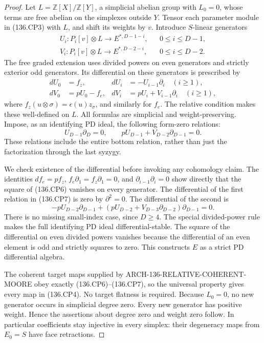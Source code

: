 \begin{proof}
Let \(L=\mathbb Z[X]/\mathbb Z[Y]\), a simplicial abelian
group with \(L_0=0\), whose terms are free abelian on the
simplexes outside \(Y\). Tensor each parameter module in
(136.CP3) with \(L\), and shift its weights by \(v\).
Introduce \(S\)-linear generators
\[
 \begin{array}{lll}
 U_i:P_i[v]\otimes L\longrightarrow E^{*,D-1-i},
       &&0\leq i\leq D-1,\\
 V_i:P_i[v]\otimes L\longrightarrow E^{*,D-2-i},
       &&0\leq i\leq D-2.
 \end{array}                                             \tag{136.CP5}
\]
The free graded extension uses divided powers on even generators
and strictly exterior odd generators. Its differential on these
generators is prescribed by
\[
 \begin{aligned}
 dU_0&=f_z,&
 dU_i&=-U_{i-1}\partial_i\quad(i\geq1),\\
 dV_0&=pU_0-f_e,&
 dV_i&=pU_i+V_{i-1}\partial_i\quad(i\geq1),
 \end{aligned}                                             \tag{136.CP6}
\]
where \(f_z(u\otimes\sigma)=\epsilon(u)z_\sigma\), and
similarly for \(f_e\). The relative condition makes these
well-defined on \(L\). All formulas are simplicial and
weight-preserving. Impose, as an identifying PD ideal, the
following form-zero relations:
\[
 U_{D-1}\partial_D=0,
 \qquad pU_{D-1}+V_{D-2}\partial_{D-1}=0.                \tag{136.CP7}
\]
These relations include the entire bottom relation, rather
than just the factorization through the last syzygy.

We check existence of the differential before invoking any
cohomology claim. The identities \(df_e=pf_z\),
\(f_e\partial_1=f_z\partial_1=0\), and
\(\partial_{i-1}\partial_i=0\) show directly that the square
of (136.CP6) vanishes on every generator. The differential of
the first relation in (136.CP7) is zero by \(\partial^2=0\).
The differential of the second is
\[
 -pU_{D-2}\partial_{D-1}
 +(pU_{D-2}+V_{D-3}\partial_{D-2})\partial_{D-1}=0.
\]
There is no missing small-index case, since \(D\geq4\).
The special divided-power rule makes the full identifying PD
ideal differential-stable. The square of the differential on
even divided powers vanishes because the differential of an
even element is odd and strictly squares to zero. This
constructs \(E\) as a strict PD differential algebra.

The coherent target maps supplied by
ARCH-136-RELATIVE-COHERENT-MOORE obey exactly (136.CP6)--(136.CP7),
so the universal property gives every map in (136.CP4).
No target flatness is required. Because \(L_0=0\), no new
generator occurs in simplicial degree zero. Every new generator
has positive weight. Hence the assertions about degree zero
and weight zero follow. In particular coefficients stay
injective in every simplex: their degeneracy maps from
\(E_0=S\) have face retractions.


\end{proof}
